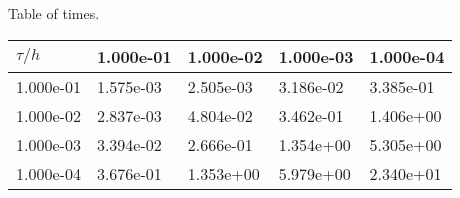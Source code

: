\begin{center}
Table of times.
\begin{tabular}{|p{1in}|p{1in}|p{1in}|p{1in}|p{1in}|} \hline
$\tau / h$ &1.000e-01 &1.000e-02 &1.000e-03 &1.000e-04 \\ \hline 
1.000e-01 &1.575e-03 &2.505e-03 &3.186e-02 &3.385e-01 \\ \hline 
1.000e-02 &2.837e-03 &4.804e-02 &3.462e-01 &1.406e+00 \\ \hline 
1.000e-03 &3.394e-02 &2.666e-01 &1.354e+00 &5.305e+00 \\ \hline 
1.000e-04 &3.676e-01 &1.353e+00 &5.979e+00 &2.340e+01 \\ \hline 

\end{tabular}\\[20pt]
\end{center}
